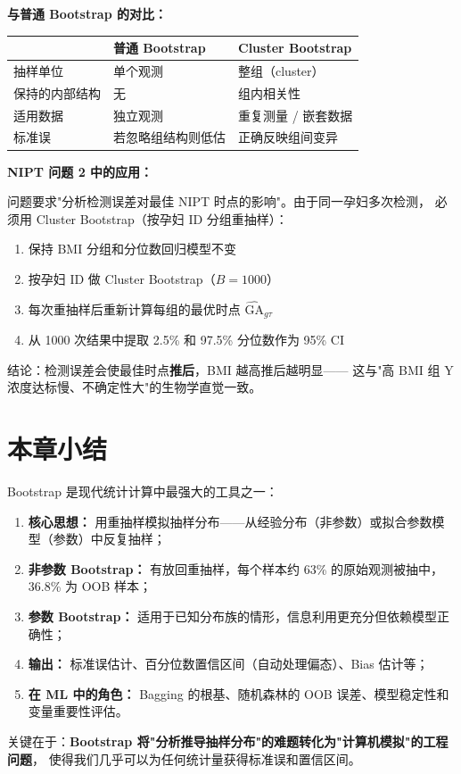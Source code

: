 \medskip
\textbf{与普通 Bootstrap 的对比：}

\begin{center}
\renewcommand{\arraystretch}{1.4}
\begin{tabular}{p{2.5cm}|p{4.5cm}|p{4.5cm}}
\toprule
& \textbf{普通 Bootstrap} & \textbf{Cluster Bootstrap} \\
\midrule
抽样单位 & 单个观测 & 整组（cluster） \\
保持的内部结构 & 无 & 组内相关性 \\
适用数据 & 独立观测 & 重复测量 / 嵌套数据 \\
标准误 & 若忽略组结构则低估 & 正确反映组间变异 \\
\bottomrule
\end{tabular}
\end{center}

\medskip
\textbf{NIPT 问题 2 中的应用：}

问题要求"分析检测误差对最佳 NIPT 时点的影响"。由于同一孕妇多次检测，
必须用 Cluster Bootstrap（按孕妇 ID 分组重抽样）：

\begin{enumerate}[label=(\arabic*)]
    \item 保持 BMI 分组和分位数回归模型不变
    \item 按孕妇 ID 做 Cluster Bootstrap（$B=1000$）
    \item 每次重抽样后重新计算每组的最优时点 $\widehat{\mathrm{GA}}_{g\tau}$
    \item 从 1000 次结果中提取 2.5\% 和 97.5\% 分位数作为 95\% CI
\end{enumerate}

结论：检测误差会使最佳时点\textbf{推后}，BMI 越高推后越明显——
这与"高 BMI 组 Y 浓度达标慢、不确定性大"的生物学直觉一致。

\section*{本章小结}

Bootstrap 是现代统计计算中最强大的工具之一：

\begin{enumerate}
    \item \textbf{核心思想：} 用重抽样模拟抽样分布——从经验分布（非参数）或拟合参数模型（参数）中反复抽样；
    \item \textbf{非参数 Bootstrap：} 有放回重抽样，每个样本约 63\% 的原始观测被抽中，36.8\% 为 OOB 样本；
    \item \textbf{参数 Bootstrap：} 适用于已知分布族的情形，信息利用更充分但依赖模型正确性；
    \item \textbf{输出：} 标准误估计、百分位数置信区间（自动处理偏态）、Bias 估计等；
    \item \textbf{在 ML 中的角色：} Bagging 的根基、随机森林的 OOB 误差、模型稳定性和变量重要性评估。
\end{enumerate}

关键在于：\textbf{Bootstrap 将"分析推导抽样分布"的难题转化为"计算机模拟"的工程问题}，
使得我们几乎可以为任何统计量获得标准误和置信区间。

